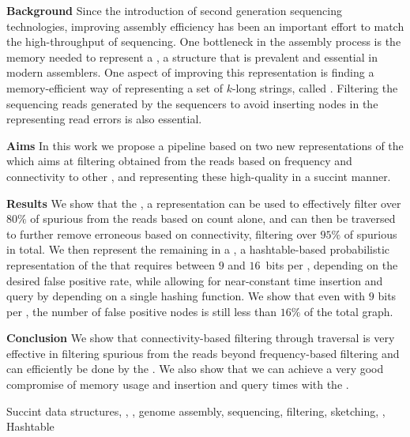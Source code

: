 \abstract

\textbf{Background} Since the introduction of second generation sequencing technologies, improving assembly efficiency has been an important effort to match the high-throughput of sequencing. One bottleneck in the assembly process is the memory needed to represent a \dBG, a structure that is prevalent and essential in modern assemblers. One aspect of improving this representation is finding a memory-efficient way of representing a set of $k$-long strings, called \kmers. Filtering the sequencing reads generated by the sequencers to avoid inserting nodes in the \dBG representing read errors is also essential.

\textbf{Aims} In this work we propose a pipeline based on two new representations of the \dBG which aims at filtering  obtained from the reads based on frequency and connectivity to other , and representing these high-quality  in a succint manner.

\textbf{Results} We show that the \dBCM, a  representation can be used to effectively filter over $80\%$ of spurious  from the reads based on count alone, and can then be traversed to further remove erroneous  based on connectivity, filtering over $95\%$ of spurious  in total. We then represent the remaining  in a \dBHT, a hashtable-based probabilistic representation of the \dBG that requires between $9$ and $16$~bits per \kmer, depending on the desired false positive rate, while allowing for near-constant time insertion and query by depending on a single hashing function. We show that even with $9$ bits per \kmer, the number of false positive nodes is still less than $16\%$ of the total graph.

\textbf{Conclusion} We show that connectivity-based filtering through traversal is very effective in filtering spurious  from the reads beyond frequency-based filtering and can efficiently be done by the \dBCM. We also show that we can achieve a very good compromise of memory usage and insertion and query times with the \dBHT.

\begin{keywords}
Succint data structures, \dBG, \kmer, genome assembly, sequencing, filtering, sketching, \cm, Hashtable
\end{keywords}